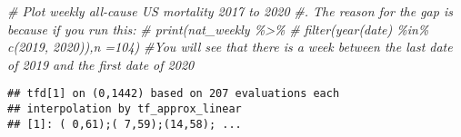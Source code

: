 \documentclass[
]{article}
\newenvironment{Shaded}{\begin{snugshade}}{\end{snugshade}}
\newcommand{\AttributeTok}[1]{\textcolor[rgb]{0.13,0.29,0.53}{#1}}
\newcommand{\CommentTok}[1]{\textcolor[rgb]{0.56,0.35,0.01}{\textit{#1}}}
\newcommand{\DecValTok}[1]{\textcolor[rgb]{0.00,0.00,0.81}{#1}}
\newcommand{\FunctionTok}[1]{\textcolor[rgb]{0.13,0.29,0.53}{\textbf{#1}}}
\newcommand{\NormalTok}[1]{#1}
\newcommand{\OtherTok}[1]{\textcolor[rgb]{0.56,0.35,0.01}{#1}}
\newcommand{\SpecialCharTok}[1]{\textcolor[rgb]{0.81,0.36,0.00}{\textbf{#1}}}
\begin{document}
\begin{Shaded}
\begin{Highlighting}[]
\CommentTok{\#  Plot weekly all{-}cause US mortality 2017 to 2020}
\CommentTok{\#. The reason for the gap is because if you run this:}
\CommentTok{\# print(nat\_weekly \%\textgreater{}\%}
\CommentTok{\#         filter(year(date) \%in\% c(2019, 2020)),n =104)}
\CommentTok{\#You will see that there is a week between the last date of 2019 and the first date of 2020}
\end{Highlighting}
\end{Shaded}

\begin{Shaded}
\end{Shaded}

\begin{verbatim}
## tfd[1] on (0,1442) based on 207 evaluations each
## interpolation by tf_approx_linear 
## [1]: ( 0,61);( 7,59);(14,58); ...
\end{verbatim}
\end{document}
